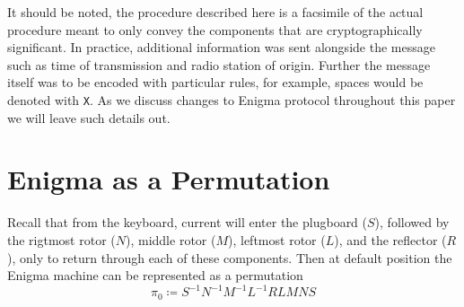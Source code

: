 \noindent It should be noted, the procedure described here is a
facsimile of the actual procedure meant to only convey the components
that are cryptographically significant. In practice, additional
information was sent alongside the message such as time of
transmission and radio station of origin. Further the message itself
was to be encoded with particular rules, for example, spaces would be
denoted with \texttt{X}. As we discuss changes to Enigma protocol
throughout this paper we will leave such details out.


\section{Enigma as a Permutation}

Recall that from the keyboard, current will enter the plugboard
($S$), followed by the rigtmost rotor ($N$), middle
rotor ($M$), leftmost rotor ($L$), and the reflector ($R$), only to
return through each of these components. Then at default position the
Enigma machine can be represented as a permutation
\[
  \pi_0 \coloneq S^{-1}N^{-1}M^{-1}L^{-1}RLMNS
\]

